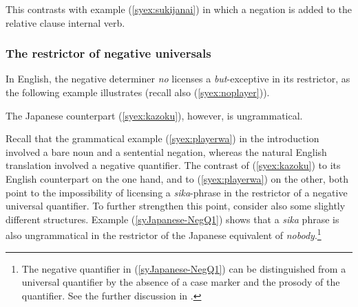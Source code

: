 \documentclass[output=paper]{langscibook}
\begin{document}
\z

This contrasts with example (\ref{syex:sukijanai}) in which a negation is added to the relative clause internal verb.

\z

\subsubsection{The restrictor of negative universals}   
In English, the negative determiner \emph{no} licenses a \emph{but}-exceptive in its restrictor, as the following example illustrates (recall also (\ref{syex:noplayer})).

\z

The  Japanese counterpart (\ref{syex:kazoku}), however, is ungrammatical.

\z

Recall that the grammatical example (\ref{syex:playerwa}) in the introduction involved a bare noun and a sentential negation, whereas the natural English translation involved a negative quantifier. The contrast of (\ref{syex:kazoku}) to its English counterpart on the one hand, and to (\ref{syex:playerwa}) on the other, both point to the impossibility of licensing a \emph{sika}-phrase in the restrictor of a negative universal quantifier. To further strengthen this point, consider also some slightly different structures.
Example (\ref{syJapanese-NegQ1}) shows that a \emph{sika} phrase is also ungrammatical in the restrictor of the Japanese equivalent of \emph{nobody}.\footnote{The negative quantifier in (\ref{syJapanese-NegQ1}) can be distinguished from a universal quantifier by the absence of a case marker and the prosody of the quantifier. See the further discussion in .}
\end{document}
